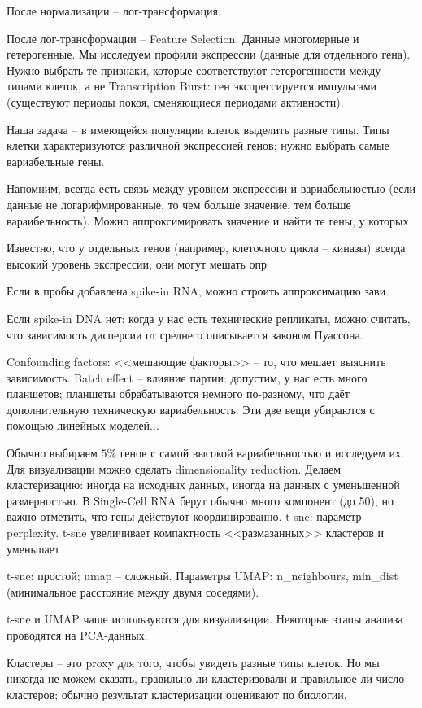 \documentclass[main.tex]{subfiles}
\begin{document}
После нормализации -- лог-трансформация.

После лог-трансформации -- Feature Selection.
Данные многомерные и гетерогенные.
Мы исследуем профили экспрессии (данные для отдельного гена).
Нужно выбрать те признаки, которые соответствуют гетерогенности между типами клеток, а не 
Transcription Burst: ген экспрессируется импульсами (существуют периоды покоя, сменяющиеся периодами активности).

Наша задача -- в имеющейся популяции клеток выделить разные типы.
Типы клетки характеризуются различной экспрессией генов; нужно выбрать самые вариабельные гены.

Напомним, всегда есть связь между уровнем экспрессии и вариабельностью (если данные не логарифмированные, то чем больше значение, тем больше вараибельность).
Можно аппроксимировать значение %
и найти те гены, у которых 

Известно, что у отдельных генов (например, клеточного цикла -- киназы) всегда высокий уровень экспрессии; они могут мешать опр

Если в пробы добавлена spike-in RNA, можно строить аппроксимацию зави

Если spike-in DNA нет: когда у нас есть технические репликаты, можно считать, что зависимость дисперсии от среднего описывается законом Пуассона.

Confounding factors: <<мешающие факторы>> -- то, что мешает выяснить зависимость.
Batch effect -- влияние партии: допустим, у нас есть много планшетов; планшеты обрабатываются немного по-разному, что даёт дополнительную техническую вариабельность.
Эти две вещи убираются с помощью линейных моделей... %

Обычно выбираем $ 5\% $ генов с самой высокой вариабельностью и исследуем их.
Для визуализации можно сделать dimensionality reduction.
Делаем кластеризацию: иногда на исходных данных, иногда на данных с уменьшенной размерностью.
В Single-Cell RNA берут обычно много компонент (до 50), но важно отметить, что гены действуют координированно.
t-sne: параметр -- perplexity. t-sne увеличивает компактность <<размазанных>> кластеров и уменьшает 

t-sne: простой; umap -- сложный.
Параметры UMAP: n\_neighbours, min\_dist (минимальное расстояние между двумя соседями).

t-sne и UMAP чаще используются для визуализации.
Некоторые этапы анализа проводятся на PCA-данных.

Кластеры -- это proxy для того, чтобы увидеть разные типы клеток.
Но мы никогда не можем сказать, правильно ли кластеризовали и правильное ли число кластеров; обычно результат кластеризации оценивают по биологии.
\end{document}
